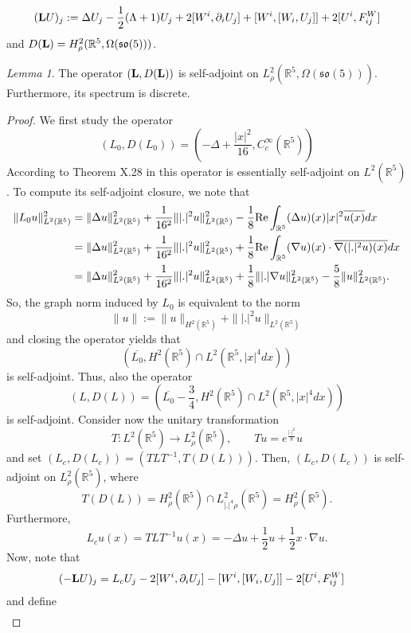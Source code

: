 \documentclass[11pt,reqno]{amsart}
\theoremstyle{remark}
\newtheorem{lem}{Lemma}[section]
\newcommand{\R}{\mathbb{R}}
\newcommand{\Lf}{\textup{\textbf{L}}}
\renewcommand{\Re}{\textup{Re}}
\theoremstyle{definition}
\begin{document}
\begin{equation*}
        (\Lf U)_j := \Delta U_j -\frac12(\Lambda+1) U_j+2[W^i, \partial_iU_j]+[W^i,[W_i,U_j]]+2[U^i,F_{ij}^W]
\end{equation*}
and
$D(\Lf)= H^2_\rho(\R^5,\Omega(\mathfrak{so}(5)))$.
\begin{lem}\label{lem: self-adjoint}
    The operator $(\Lf,D(\Lf))$ is self-adjoint on $L^2_\rho(\R^5,\Omega (\mathfrak{so}(5)))$. Furthermore, its spectrum is discrete. 
\end{lem}
\begin{proof}
We first study the operator 
$$
    (L_0,D(L_0))=\left(-\Delta +\frac{|x|^2}{16},C^\infty_c(\R^5)\right)
    $$
    According to Theorem X.28 in \cite{ReeSim75}  this operator
    is essentially self-adjoint on $L^2(\R^5)$. 
    To compute its self-adjoint closure, we note that 
    \begin{align*}
    \|L_0u\|_{L^2(\R^5)}^2&= \|\Delta u\|_{L^2(\R^5)}^2+\frac{1}{16^2}\| |.|^2u\|_{L^2(\R^5)}^2-\frac{1}{8}\Re\int_{\R^5} (\Delta u)(x) |x|^2 \overline{u(x)} dx
    \\
    &= \|\Delta u\|_{L^2(\R^5)}^2+\frac{1}{16^2}\||.|^2u\|_{L^2(\R^5)}^2+ \frac{1}{8}\Re\int_{\R^5} (\nabla u)(x) \cdot \overline{\nabla (|.|^2 u)(x) }dx
    \\
    &= \|\Delta u\|_{L^2(\R^5)}^2+\frac{1}{16^2}\||.|^2u\|_{L^2(\R^5)}^2+\frac{1}{8}\||.|\nabla u\|_{L^2(\R^5)}^2- \frac{5}{8}\|u\|_{L^2(\R^5)}^2.
   \end{align*}
   So, the graph norm induced by $L_0$ is equivalent to the norm 
   $$
\|u\|:=\|u\|_{H^2(\R^5)}+\||.|^2 u\|_{L^2(\R^5)}
   $$
   and closing the operator yields that
   $$
\left(\overline{L_0}, H^2(\R^5)\cap L^2(\R^5, |x|^4 dx)\right)
   $$
   is self-adjoint. 
    Thus, also the operator 
    $$
(L,D(L))=\left(\overline{L_0}-\frac34, H^2(\R^5)\cap L^2(\R^5, |x|^4 dx)\right)
    $$
    is self-adjoint.
Consider now the unitary transformation 
\[T:L^2(\R^5)\to L^2_\rho(\R^5),\qquad   Tu= e^{\frac{|\cdot|^2}{8}}u\]
and set $(L_c, D(L_c))= (T L T^{-1}, T(D(L))).$ Then, $(L_c, D(L_c))$ is self-adjoint on $L^2_\rho(\R^5)$,
where 
\[
T(D(L))=H^2_\rho(\R^5)\cap L^2_{|.|^4\rho}(\R^5)=H^2_\rho(\R^5).
\]
Furthermore,     
\[
L_c u(x)= T LT^{-1} u(x)=-\Delta u+\frac12 u+\frac12x\cdot \nabla u. 
\]
Now, note that 
\begin{align*}
    (-\Lf U)_j &=L_c U_j-2[W^i, \partial_iU_j]-[W^i,[W_i,U_j]]-2[U^i,F_{ij}^W]
\end{align*}
and define 
\begin{align*}

\end{align*}
\end{proof}
\end{document}
